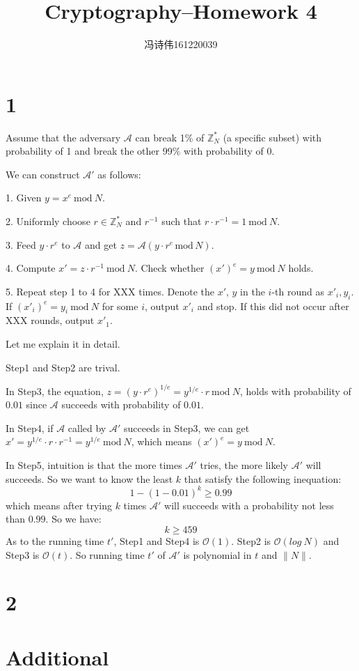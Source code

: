 \documentclass[a4papers]{ctexart}
\title{Cryptography--Homework 4}
\author{冯诗伟161220039}
\date{}
\newcommand{\mc}[1]{\mathcal{#1}}
\newcommand{\mr}[1]{\ \mathrm{#1}\ }
\begin{document}
\maketitle
\section*{1}
Assume that the adversary $\mathcal{A}$ can break 1$\%$ of $\mathbb{Z}_N^*$ (a specific subset)
with probability of 1 and break the other 99$\%$ with probability of 0.
 
We can construct $\mathcal{A'}$ as follows:

1. Given $y=x^e \mr{mod} N$.

2. Uniformly choose $r \in \mathbb{Z}_N^*$ and $r^{-1}$ such that $r\cdot r^{-1} = 1 \mr{mod} N$.

3. Feed $y\cdot r^e$ to $\mathcal{A}$ and get $z = \mathcal{A}(y\cdot r^e\, \mathrm{mod}\, N)$.

4. Compute $x' = z\cdot r^{-1} \mr{mod} N$. Check whether $(x')^e = y \mr{mod} N$ holds.

5. Repeat step 1 to 4 for XXX times.
 Denote the $x',\, y $ in the $i$-th round as $x'_i, y_i$.
If $(x'_i)^e = y_i \mr{mod} N$ for some $i$, output $x'_i$ and stop. 
If this did not occur after XXX rounds, output $x'_1$.

Let me explain it in detail.

Step1 and Step2 are trival.

In Step3, the equation, $z=(y\cdot r^e)^{1/e}= y^{1/e}\cdot r \mr{mod} N$, holds with probability of $0.01$ since $\mc{A}$ succeeds with probability of $0.01$.

In Step4, if $\mc{A}$ called by $\mc{A'}$ succeeds in Step3, we can get $x' = y^{1/e}\cdot r\cdot r^{-1} = y^{1/e} \mr{mod} N$, which means $(x')^e = y \mr{mod} N$.

In Step5,
intuition is that the more times $\mc{A'}$ tries, the more likely $\mc{A'}$ will succeeds. 
So we want to know the least $k$ that satisfy the following inequation:
\[ 1- (1-0.01)^k \ge 0.99\]
which means after trying $k$ times $\mc{A'}$ will succeeds with a probability not less than $0.99$.
So we have:\[ k \ge 459\]
As to the running time $t'$, Step1 and Step4 is $\mc{O}(1)$. Step2 is $\mc{O}(log\ N)$ and Step3 is $\mc{O}(t)$.
So running time $t'$ of $\mc{A'}$ is polynomial in $t$ and $\lVert N \rVert$.

\section*{2}
\section*{Additional}
\end{document}
